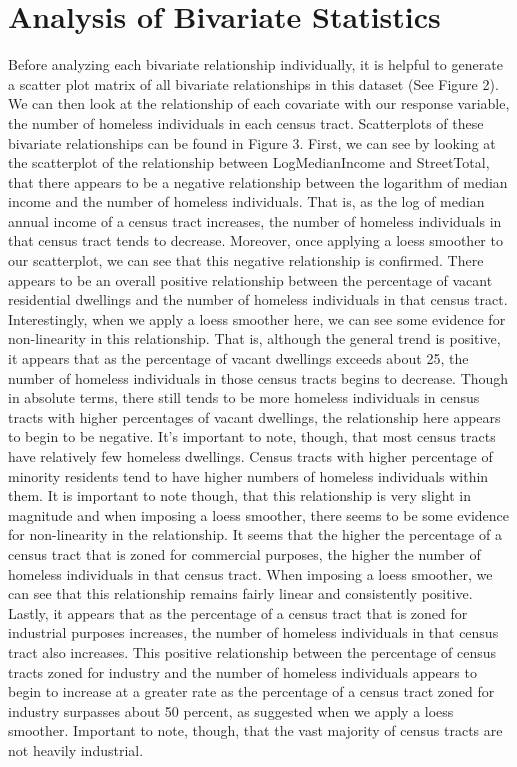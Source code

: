 \documentclass[titlepage]{article}   	%
\begin{document}
\section{Analysis of Bivariate Statistics}

\indent Before analyzing each bivariate relationship individually, it is helpful to generate a scatter plot matrix of all bivariate relationships in this dataset (See Figure 2). We can then look at the relationship of each covariate with our response variable, the number of homeless individuals in each census tract. Scatterplots of these bivariate relationships can be found in Figure 3. First, we can see by looking at the scatterplot of the relationship between LogMedianIncome and StreetTotal, that there appears to be a negative relationship between the logarithm of median income and the number of homeless individuals. That is, as the log of median annual income of a census tract increases, the number of homeless individuals in that census tract tends to decrease. Moreover, once applying a loess smoother to our scatterplot, we can see that this negative relationship is confirmed. There appears to be an overall positive relationship between the percentage of vacant residential dwellings and the number of homeless individuals in that census tract. Interestingly, when we apply a loess smoother here, we can see some evidence for non-linearity in this relationship. That is, although the general trend is positive, it appears that as the percentage of vacant dwellings exceeds about 25, the number of homeless individuals in those census tracts begins to decrease. Though in absolute terms, there still tends to be more homeless individuals in census tracts with higher percentages of vacant dwellings, the relationship here appears to begin to be negative. It’s important to note, though, that most census tracts have relatively few homeless dwellings. Census tracts with higher percentage of minority residents tend to have higher numbers of homeless individuals within them. It is important to note though, that this relationship is very slight in magnitude and when imposing a loess smoother, there seems to be some evidence for non-linearity in the relationship. It seems that the higher the percentage of a census tract that is zoned for commercial purposes, the higher the number of homeless individuals in that census tract. When imposing a loess smoother, we can see that this relationship remains fairly linear and consistently positive. Lastly, it appears that as the percentage of a census tract that is zoned for industrial purposes increases, the number of homeless individuals in that census tract also increases. This positive relationship between the percentage of census tracts zoned for industry and the number of homeless individuals appears to begin to increase at a greater rate as the percentage of a census tract zoned for industry surpasses about 50 percent, as suggested when we apply a loess smoother. Important to note, though, that the vast majority of census tracts are not heavily industrial. 
\end{document}
